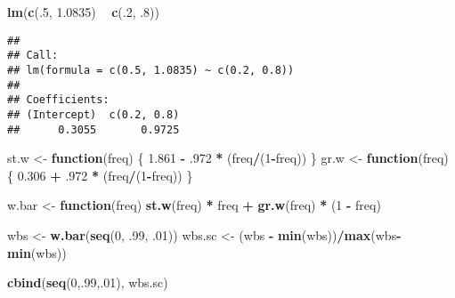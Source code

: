 \documentclass[]{article}
\newenvironment{Shaded}{\begin{snugshade}}{\end{snugshade}}
\newcommand{\KeywordTok}[1]{\textcolor[rgb]{0.13,0.29,0.53}{\textbf{#1}}}
\newcommand{\DecValTok}[1]{\textcolor[rgb]{0.00,0.00,0.81}{#1}}
\newcommand{\FloatTok}[1]{\textcolor[rgb]{0.00,0.00,0.81}{#1}}
\newcommand{\StringTok}[1]{\textcolor[rgb]{0.31,0.60,0.02}{#1}}
\newcommand{\ControlFlowTok}[1]{\textcolor[rgb]{0.13,0.29,0.53}{\textbf{#1}}}
\newcommand{\OperatorTok}[1]{\textcolor[rgb]{0.81,0.36,0.00}{\textbf{#1}}}
\newcommand{\NormalTok}[1]{#1}
\begin{document}
\begin{Shaded}
\begin{Highlighting}[]
\KeywordTok{lm}\NormalTok{(}\KeywordTok{c}\NormalTok{(.}\DecValTok{5}\NormalTok{, }\FloatTok{1.0835}\NormalTok{) }\OperatorTok{~}\StringTok{ }\KeywordTok{c}\NormalTok{(.}\DecValTok{2}\NormalTok{, .}\DecValTok{8}\NormalTok{))}
\end{Highlighting}
\end{Shaded}

\begin{verbatim}
## 
## Call:
## lm(formula = c(0.5, 1.0835) ~ c(0.2, 0.8))
## 
## Coefficients:
## (Intercept)  c(0.2, 0.8)  
##      0.3055       0.9725
\end{verbatim}

\begin{Shaded}
\begin{Highlighting}[]
\NormalTok{st.w <-}\StringTok{ }\ControlFlowTok{function}\NormalTok{(freq) \{ }\FloatTok{1.861} \OperatorTok{-}\StringTok{ }\NormalTok{.}\DecValTok{972} \OperatorTok{*}\StringTok{ }\NormalTok{(freq}\OperatorTok{/}\NormalTok{(}\DecValTok{1}\OperatorTok{-}\NormalTok{freq)) \}}
\NormalTok{gr.w <-}\StringTok{ }\ControlFlowTok{function}\NormalTok{(freq) \{ }\FloatTok{0.306} \OperatorTok{+}\StringTok{ }\NormalTok{.}\DecValTok{972} \OperatorTok{*}\StringTok{ }\NormalTok{(freq}\OperatorTok{/}\NormalTok{(}\DecValTok{1}\OperatorTok{-}\NormalTok{freq)) \}}



\NormalTok{w.bar <-}\StringTok{ }\ControlFlowTok{function}\NormalTok{(freq) }\KeywordTok{st.w}\NormalTok{(freq) }\OperatorTok{*}\StringTok{ }\NormalTok{freq }\OperatorTok{+}\StringTok{ }\KeywordTok{gr.w}\NormalTok{(freq) }\OperatorTok{*}\StringTok{ }\NormalTok{(}\DecValTok{1} \OperatorTok{-}\StringTok{ }\NormalTok{freq)}

\NormalTok{wbs <-}\StringTok{ }\KeywordTok{w.bar}\NormalTok{(}\KeywordTok{seq}\NormalTok{(}\DecValTok{0}\NormalTok{, .}\DecValTok{99}\NormalTok{, .}\DecValTok{01}\NormalTok{))}
\NormalTok{wbs.sc <-}\StringTok{ }\NormalTok{(wbs }\OperatorTok{-}\StringTok{ }\KeywordTok{min}\NormalTok{(wbs))}\OperatorTok{/}\KeywordTok{max}\NormalTok{(wbs}\OperatorTok{-}\KeywordTok{min}\NormalTok{(wbs))}

\KeywordTok{cbind}\NormalTok{(}\KeywordTok{seq}\NormalTok{(}\DecValTok{0}\NormalTok{,.}\DecValTok{99}\NormalTok{,.}\DecValTok{01}\NormalTok{), wbs.sc)}
\end{Highlighting}
\end{Shaded}
\end{document}
